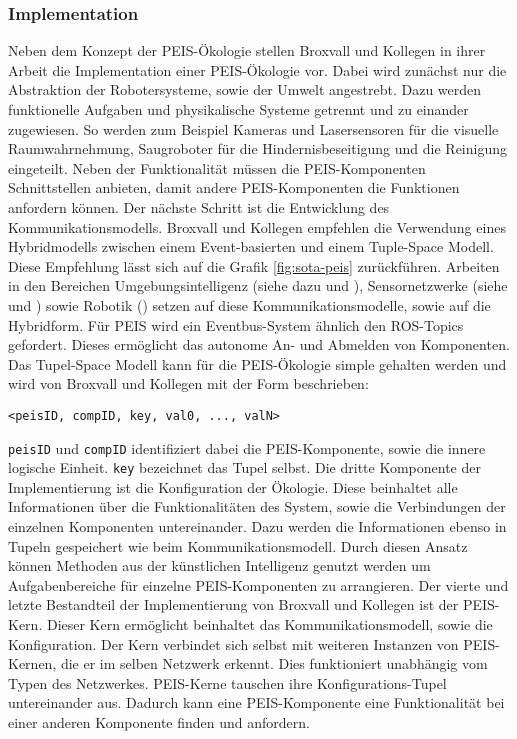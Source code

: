 \subsubsection{Implementation}
\label{sec:peis-imple}
Neben dem Konzept der PEIS-Ökologie stellen Broxvall und Kollegen in ihrer Arbeit die Implementation einer PEIS-Ökologie vor. Dabei wird zunächst nur die Abstraktion der Robotersysteme, sowie der Umwelt angestrebt. Dazu werden funktionelle Aufgaben und physikalische Systeme getrennt und zu einander zugewiesen. So werden zum Beispiel Kameras und Lasersensoren für die visuelle Raumwahrnehmung, Saugroboter für die Hindernisbeseitigung und die Reinigung eingeteilt. Neben der Funktionalität müssen die PEIS-Komponenten Schnittstellen anbieten, damit andere PEIS-Komponenten die Funktionen anfordern können. Der nächste Schritt ist die Entwicklung des Kommunikationsmodells. Broxvall und Kollegen empfehlen die Verwendung eines Hybridmodells zwischen einem Event-basierten und einem Tuple-Space Modell. Diese Empfehlung lässt sich auf die Grafik \ref{fig:sota-peis} zurückführen. Arbeiten in den Bereichen Umgebungsintelligenz (siehe dazu \cite{arregui2003stitch} und \cite{siegemund2004context}), Sensornetzwerke (siehe \cite{adjie1999design} und \cite{heidemann2001building}) sowie Robotik (\cite{caceres2003real}) setzen auf diese Kommunikationsmodelle, sowie auf die Hybridform. Für PEIS wird ein Eventbus-System ähnlich den ROS-Topics gefordert. Dieses ermöglicht das autonome An- und Abmelden von Komponenten. Das Tupel-Space Modell kann für die PEIS-Ökologie simple gehalten werden und wird von Broxvall und Kollegen mit der Form beschrieben:

{\tt <peisID, compID, key, val0, ..., valN>}

{\tt peisID} und {\tt compID} identifiziert dabei die PEIS-Komponente, sowie die innere logische Einheit. {\tt key} bezeichnet das Tupel selbst. Die dritte Komponente der Implementierung ist die Konfiguration der Ökologie. Diese beinhaltet alle Informationen über die Funktionalitäten des System, sowie die Verbindungen der einzelnen Komponenten untereinander. Dazu werden die Informationen ebenso in Tupeln gespeichert wie beim Kommunikationsmodell. Durch diesen Ansatz können Methoden aus der künstlichen Intelligenz genutzt werden um Aufgabenbereiche für einzelne PEIS-Komponenten zu arrangieren.\cite{lundh2005can} Der vierte und letzte Bestandteil der Implementierung von Broxvall und Kollegen ist der PEIS-Kern. Dieser Kern ermöglicht beinhaltet das Kommunikationsmodell, sowie die Konfiguration. Der Kern verbindet sich selbst mit weiteren Instanzen von PEIS-Kernen, die er im selben Netzwerk erkennt. Dies funktioniert unabhängig vom Typen des Netzwerkes. PEIS-Kerne tauschen ihre Konfigurations-Tupel untereinander aus. Dadurch kann eine PEIS-Komponente eine Funktionalität bei einer anderen Komponente finden und anfordern.\cite{Saffiotti:2005:PEA:1107548.1107615}

